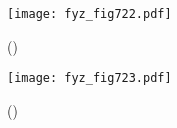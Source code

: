     \begin{figure}[ht!] %
      \centering
      \texttt{[image: fyz\_fig722.pdf]}
      \caption{
               (\cite[s.~707]{Feynman02})}
      \label{fyz_fig722}
    \end{figure}

    \begin{figure}[ht!] %
      \centering
      \texttt{[image: fyz\_fig723.pdf]}
      \caption{
               (\cite[s.~707]{Feynman02})}
      \label{fyz_fig723}
    \end{figure}


\printbibliography[title={Seznam literatury},heading=subbibliography]

